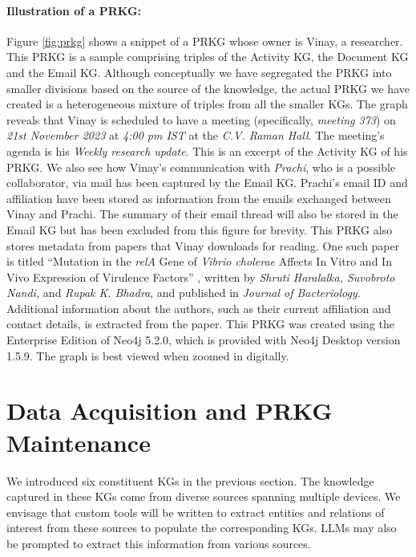 \documentclass[11pt,pdftex]{article}
\begin{document}
\paragraph{Illustration of a PRKG:} Figure \ref{fig:prkg} shows a snippet of a PRKG whose owner is Vinay, a researcher. This PRKG is a sample comprising triples of the Activity KG, the Document KG and the Email KG. Although conceptually we have segregated the PRKG into smaller divisions based on the source of the knowledge, the actual PRKG we have created is a heterogeneous mixture of triples from all the smaller KGs. The graph reveals that Vinay is scheduled to have a meeting (specifically, \textit{meeting 373}) on \textit{21st November 2023} at \textit{4:00 pm IST} at the \textit{C.V. Raman Hall}. The meeting's agenda is his \textit{Weekly research update}. This is an excerpt of the Activity KG of his PRKG. We also see how Vinay's communication with \textit{Prachi}, who is a possible collaborator, via mail has been captured by the Email KG. Prachi's email ID and affiliation have been stored as information from the emails exchanged between Vinay and Prachi. The summary of their email thread will also be stored in the Email KG but has been excluded from this figure for brevity. This PRKG also stores metadata from papers that Vinay downloads for reading. One such paper is titled  ``Mutation in the \textit{relA} Gene of \textit{Vibrio cholerae} Affects In Vitro and In Vivo Expression of Virulence Factors''  \cite{haralalka2003mutation}, written by \textit{Shruti Haralalka, Suvobroto Nandi,} and \textit{Rupak K. Bhadra}, and published in \textit{Journal of Bacteriology}. Additional  information about the authors, such as their current affiliation and contact details, is extracted from the paper. This PRKG was created using the Enterprise Edition of Neo4j 5.2.0, which is provided with Neo4j Desktop version 1.5.9. The graph is best viewed when zoomed in digitally.



\section{Data Acquisition and PRKG Maintenance} 
\label{prantika_sec:acquisition}
We introduced six constituent KGs in the previous section. The knowledge captured in these KGs come from diverse sources spanning multiple devices. We envisage that custom tools will be written to extract entities and relations of interest from these sources to populate the corresponding KGs.  LLMs may also be prompted to extract this information from various sources.
\end{document}
